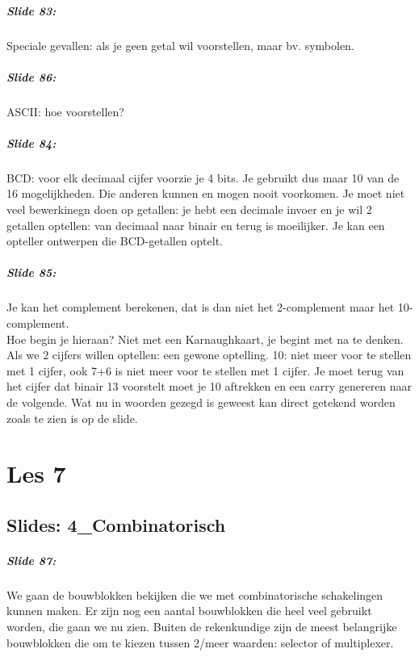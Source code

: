 \documentclass[10pt,a4paper]{book}
\begin{document}
\paragraph{Slide 83:} Speciale gevallen: als je geen getal wil voorstellen, maar bv. symbolen.

\paragraph{Slide 86:} ASCII: hoe voorstellen?

\paragraph{Slide 84:} BCD: voor elk decimaal cijfer voorzie je 4 bits. Je gebruikt dus maar 10 van de 16 mogelijkheden. Die anderen kunnen en mogen nooit voorkomen. Je moet niet veel bewerkinegn doen op getallen: je hebt een decimale invoer en je wil 2 getallen optellen: van decimaal naar binair en terug is moeilijker. Je kan een opteller ontwerpen die BCD-getallen optelt.

\paragraph{Slide 85:} Je kan het complement berekenen, dat is dan niet het 2-complement maar het 10-complement.\\
Hoe begin je hieraan? Niet met een Karnaughkaart, je begint met na te denken. Als we 2 cijfers willen optellen: een gewone optelling. 10: niet meer voor te stellen met 1 cijfer, ook 7+6 is niet meer voor te stellen met 1 cijfer. Je moet terug van het cijfer dat binair 13 voorstelt moet je 10 aftrekken en een carry genereren naar de volgende. Wat nu in woorden gezegd is geweest kan direct getekend worden zoals te zien is op de slide. 

\chapter{Les 7}

\section{Slides: 4\_Combinatorisch}

\paragraph{Slide 87:} We gaan de bouwblokken bekijken die we met combinatorische schakelingen kunnen maken. Er zijn nog een aantal bouwblokken die heel veel gebruikt worden, die gaan we nu zien. Buiten de rekenkundige zijn de meest belangrijke bouwblokken die om te kiezen tussen 2/meer waarden: selector of multiplexer.
\end{document}
